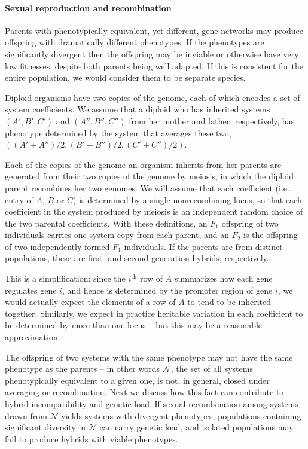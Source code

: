 \documentclass{article}
\newcommand{\1}{\mathbbm{1}}
\newcommand{\allS}{\mathcal{N}}
\begin{document}
\paragraph{Sexual reproduction and recombination}
Parents with phenotypically equivalent, yet different, gene networks may produce offspring with dramatically different phenotypes. 
If the phenotypes are significantly divergent then the offspring may be inviable or otherwise have very low fitnesses, 
despite both parents being well adapted. If this is consistent for the entire population, we would consider them to be separate species.

Diploid organisms have two copies of the genome, each of which encodes a set of system coefficients.
We assume that a diploid who has inherited systems $(A', B', C')$ and $(A'', B'', C'')$ from her mother and father, respectively,
has phenotype determined by the system that averages these two,
$((A'+A'')/2, (B'+B'')/2, (C'+C'')/2)$.

Each of the copies of the genome an organism inherits from her parents are generated from their two copies of the genome by meiosis,
in which the diploid parent recombines her two genomes.
We will assume that each coefficient (i.e., entry of $A$, $B$ or $C$)
is determined by a single nonrecombining locus,
so that each coefficient in the system produced by meiosis is an independent random choice
of the two parental coefficients.
With these definitions, an $F_1$ offspring of two individuals
carries one system copy from each parent,
and an $F_2$ is the offspring of two independently formed $F_1$ individuals.
If the parents are from distinct populations,
these are first- and second-generation hybrids, respectively.

This is a simplification:
since the $i^\text{th}$ row of $A$ summarizes how each gene regulates gene $i$,
and hence is determined by the promoter region of gene $i$,
we would actually expect the elements of a row of $A$ to tend to be inherited together.
Similarly, we expect in practice heritable variation in each coefficient
to be determined by more than one locus --
but this may be a reasonable approximation.

The offspring of two systems with the same phenotype may not have the same phenotype as the parents -- in other words $\allS$, the set of all systems phenotypically equivalent to a given one, is not, in general, closed under averaging or recombination.
Next we discuss how this fact can contribute to hybrid incompatibility and genetic load.
If sexual recombination among systems drawn from $\allS$ yields systems with divergent phenotypes, populations containing significant diversity in $\allS$ can carry genetic load, and isolated populations may fail to produce hybrids with viable phenotypes.
\end{document}
